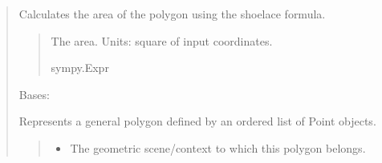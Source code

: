 \documentclass[letterpaper,10pt,english]{sphinxmanual}
\begin{document}
\begin{quote}
\begin{fulllineitems}
\begin{quote}
\begin{description}
\end{description}\end{quote}

\begin{fulllineitems}
\label{\detokenize{pygeox:pygeox.custom_objects.Parallelogram.area}}
\pysigstartsignatures
\pysigline
{}
\pysigstopsignatures
\sphinxAtStartPar
Calculates the area of the polygon using the shoelace formula.
\begin{quote}\begin{description}
\sphinxAtStartPar
The area. Units: square of input coordinates.

\sphinxAtStartPar
sympy.Expr

\end{description}\end{quote}

\end{fulllineitems}


\end{fulllineitems}


\begin{fulllineitems}
\label{\detokenize{pygeox:pygeox.custom_objects.Polygon}}
\pysigstartsignatures
\pysiglinewithargsret
{}
{\sphinxparamcomma {}\sphinxparamcomma {}\sphinxparamcomma {}\sphinxparamcomma {}}
{}
\pysigstopsignatures
\sphinxAtStartPar
Bases: 

\sphinxAtStartPar
Represents a general polygon defined by an ordered list of Point objects.
\begin{quote}\begin{description}
\begin{itemize}
\item {} 
\sphinxAtStartPar
{} \textendash{} The geometric scene/context to which this polygon belongs.


\end{itemize}
\end{description}
\end{quote}
\end{fulllineitems}
\end{quote}
\end{document}
